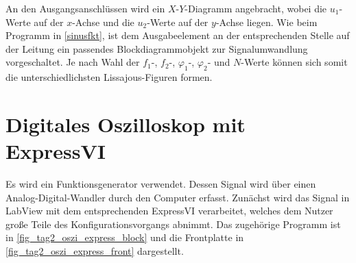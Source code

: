 \documentclass[
a4paper,
12pt,
pagesize,
ngerman
]{scrartcl}
\begin{document}
	\noindent An den Ausgangsanschlüssen wird ein $X$-$Y$-Diagramm angebracht, wobei die $u_1$-Werte auf der $x$-Achse und die $u_2$-Werte auf der $y$-Achse liegen. Wie beim Programm in \cref{sinusfkt}, ist dem Ausgabeelement an der entsprechenden Stelle auf der Leitung ein passendes Blockdiagrammobjekt zur Signalumwandlung vorgeschaltet. Je nach Wahl der $f_1$-, $f_2$-, $\varphi_1$-, $\varphi_2$- und $N$-Werte können sich somit die unterschiedlichsten Lissajous-Figuren formen.
	
	
	\section{Digitales Oszilloskop mit ExpressVI}
	Es wird ein Funktionsgenerator verwendet.
	Dessen Signal wird über einen Analog-Digital-Wandler durch den Computer erfasst.
	Zunächst wird das Signal in LabView mit dem entsprechenden ExpressVI verarbeitet, welches dem Nutzer große Teile des Konfigurationsvorgangs abnimmt.
	Das zugehörige Programm ist in \cref{fig_tag2_oszi_express_block} und die Frontplatte in \cref{fig_tag2_oszi_express_front} dargestellt.
	
\end{document}
